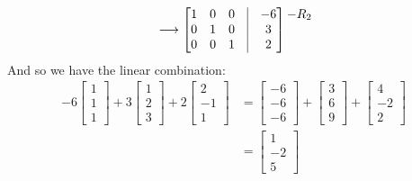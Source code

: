 \documentclass[final,expand]{problemset}
\begin{document}
{\begin{align*}
		&\longrightarrow \begin{bmatrix}
			1 & 0 & 0 & \vline & -6\\
			0 & 1 & 0 &\vline & 3\\
			0 & 0 & 1 &\vline & 2
		\end{bmatrix}\begin{matrix}
			-R_2\\ \\ \\
		\end{matrix}\\
	\end{align*}
	And so we have the linear combination:
	\begin{align*}
		-6\begin{bmatrix}
			1\\1\\1
		\end{bmatrix} + 3\begin{bmatrix}
			1 \\2\\3
		\end{bmatrix} + 2\begin{bmatrix}
			2\\-1\\1
		\end{bmatrix} &= \begin{bmatrix}
			-6\\-6\\-6
		\end{bmatrix} + \begin{bmatrix}
			3 \\6\\9
		\end{bmatrix} + \begin{bmatrix}
			4\\-2\\2
		\end{bmatrix}\\
		&= \begin{bmatrix}
			1\\-2\\5
		\end{bmatrix}
	\end{align*}
}
\end{document}

